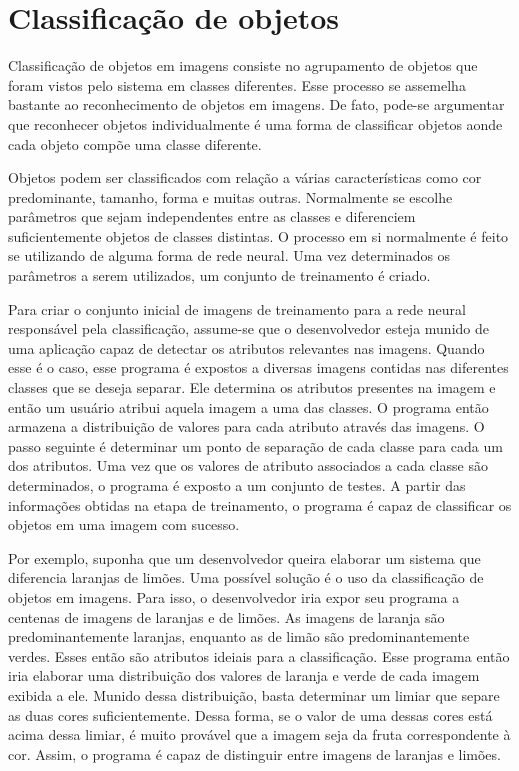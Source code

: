      \section{Classificação de objetos} \label{classificacao}
     
     Classificação de objetos em imagens consiste no agrupamento de objetos que foram vistos pelo sistema em classes diferentes. Esse processo se assemelha bastante ao reconhecimento de objetos em imagens. De fato, pode-se argumentar que reconhecer objetos individualmente é uma forma de classificar objetos aonde cada objeto compõe uma classe diferente.
     
     Objetos podem ser classificados com relação a várias características como cor predominante, tamanho, forma e muitas outras. Normalmente se escolhe parâmetros que sejam independentes entre as classes e diferenciem suficientemente objetos de classes distintas. O processo em si normalmente é feito se utilizando de alguma forma de rede neural. Uma vez determinados os parâmetros a serem utilizados, um conjunto de treinamento é criado.
    
     Para criar o conjunto inicial de imagens de treinamento para a rede neural responsável pela classificação, assume-se que o desenvolvedor esteja munido de uma aplicação capaz de detectar os atributos relevantes nas imagens. Quando esse é o caso, esse programa é expostos a diversas imagens contidas nas diferentes classes que se deseja separar. Ele determina os atributos presentes na imagem e então um usuário atribui aquela imagem a uma das classes. O programa então armazena a distribuição de valores para cada atributo através das imagens.  O passo seguinte é determinar um ponto de separação de cada classe para cada um dos atributos. Uma vez que os valores de atributo associados a cada classe são determinados, o programa é exposto a um conjunto de testes. A partir das informações obtidas na etapa de treinamento, o programa é capaz de classificar os objetos em uma imagem com sucesso.
     
     Por exemplo, suponha que um desenvolvedor queira elaborar um sistema que diferencia laranjas de limões. Uma possível solução é o uso da classificação de objetos em imagens. Para isso, o desenvolvedor iria expor seu programa a centenas de imagens de laranjas e de limões. As imagens de laranja são predominantemente laranjas, enquanto as de limão são predominantemente verdes. Esses então são atributos ideiais para a classificação. Esse programa então iria elaborar uma distribuição dos valores de laranja e verde de cada imagem exibida a ele. Munido dessa distribuição, basta determinar um limiar que separe as duas cores suficientemente. Dessa forma, se o valor de uma dessas cores está acima dessa limiar, é muito provável que a imagem seja da fruta correspondente à cor. Assim, o programa é capaz de distinguir entre imagens de laranjas e limões.
     
     
    


    